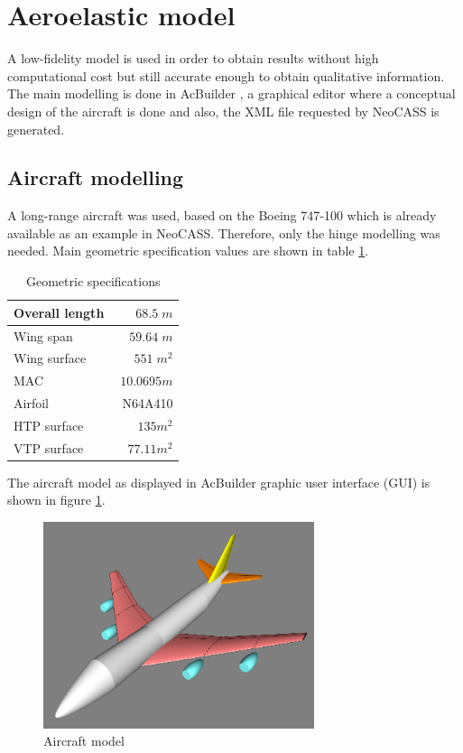\documentclass[conference]{IEEEtran}
\newlength\figureheight
\newlength\figurewidth
\begin{document}
\section{Aeroelastic model}
\label{sec:aeroelastic-model}
A low-fidelity model is used in order to obtain results without high computational cost but still accurate enough to obtain qualitative information. The main modelling is done in AcBuilder \cite{acbuilderfurther}, a graphical editor where a conceptual design of the aircraft is done and also, the XML file requested by NeoCASS is generated.

\subsection{Aircraft modelling}
A long-range aircraft was used, based on the Boeing 747-100 which is already available as an example in NeoCASS. Therefore, only the hinge modelling was needed. Main geometric specification values are shown in table \ref{tab:GeoSpec}.

\begin{table}[t]
\begin{center}
\begin{tabular}{| l | r |}
\hline
Overall length & $68.5 \; m$ \\ \hline
Wing span & $59.64 \;m$ \\ \hline
Wing surface & $551 \;m^2$ \\\hline
MAC & $ \;10.0695 m$\\\hline
Airfoil &  N64A410\\ \hline
HTP surface & $135 m^2$\\\hline
VTP surface & $77.11 m^2$\\
\hline 
\end{tabular}
\caption{Geometric specifications}
\label{tab:GeoSpec}
\end{center}
\end{table}

The aircraft model as displayed in AcBuilder graphic user interface (GUI) is shown in figure \ref{fig:AircraftModel}.

\begin{figure}[htp]
  \centering
  \setlength\figureheight{5cm}
  \setlength\figurewidth{7cm}
  \includegraphics[width=225pt]{images/AircraftModel.png}
  \caption{Aircraft model}
  \label{fig:AircraftModel}
\end{figure}
\end{document}

